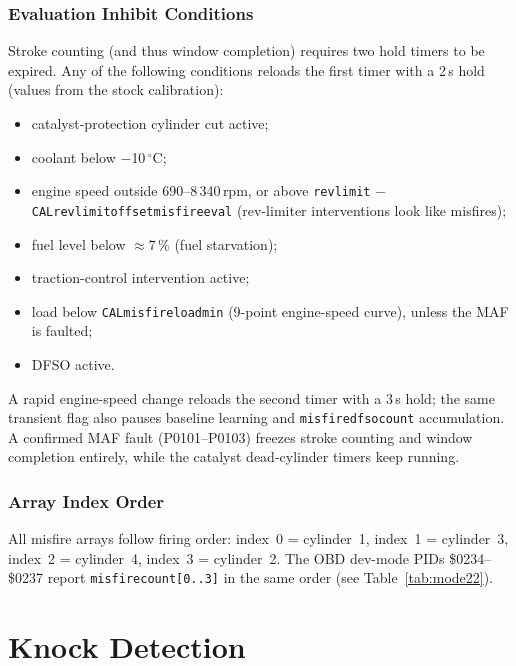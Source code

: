 \documentclass[a4paper,11pt]{article}
\renewcommand{\_}{\oldunderscore\allowbreak}
\begin{document}
\subsubsection*{Evaluation Inhibit Conditions}

Stroke counting (and thus window completion) requires two hold timers to be
expired. Any of the following conditions reloads the first timer with a
2\,s hold (values from the stock calibration):

\begin{itemize}
  \item catalyst-protection cylinder cut active;
  \item coolant below $-$10\,$^{\circ}$C;
  \item engine speed outside 690--8\,340\,rpm, or above
        \texttt{revlimit} $-$ \texttt{CAL\_revlimit\_offset\_misfire\_eval}
        (rev-limiter interventions look like misfires);
  \item fuel level below $\approx$7\,\% (fuel starvation);
  \item traction-control intervention active;
  \item load below \texttt{CAL\_misfire\_load\_min} (9-point engine-speed
        curve), unless the MAF is faulted;
  \item DFSO active.
\end{itemize}

A rapid engine-speed change reloads the second timer with a 3\,s hold; the
same transient flag also pauses baseline learning and
\texttt{misfire\_dfso\_count} accumulation. A confirmed MAF fault
(P0101--P0103) freezes stroke counting and window completion entirely, while
the catalyst dead-cylinder timers keep running.

\subsubsection*{Array Index Order}

All misfire arrays follow firing order: index~0 = cylinder~1, index~1 =
cylinder~3, index~2 = cylinder~4, index~3 = cylinder~2. The OBD dev-mode PIDs
\$0234--\$0237 report \texttt{misfire\_count[0..3]} in the same order
(see Table~\ref{tab:mode22}).

\section{Knock Detection}
\end{document}
